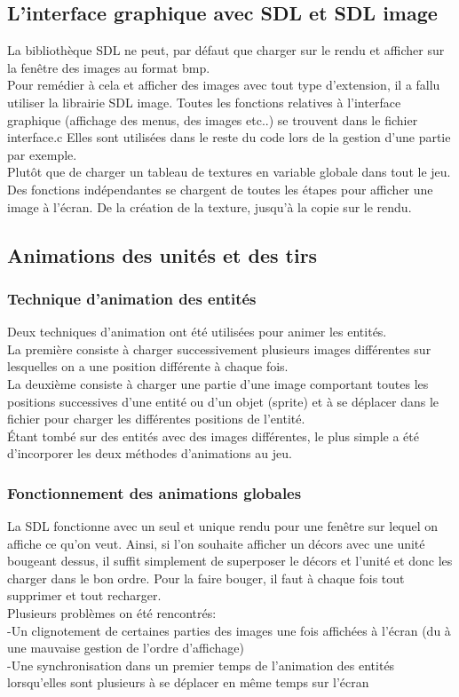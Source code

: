 \documentclass[a4paper,11pt]{article}
\begin{document}
\subsection{L'interface graphique avec SDL et SDL image}

La bibliothèque SDL ne peut, par défaut que charger sur le rendu et afficher sur la fenêtre des images au format bmp.\\
Pour remédier à cela et afficher des images avec tout type d'extension, il a fallu utiliser la librairie SDL image.
Toutes les fonctions relatives à l'interface graphique (affichage des menus, des images etc..) se trouvent dans le fichier interface.c
Elles sont utilisées dans le reste du code lors de la gestion d'une partie par exemple.\\
Plutôt que de charger un tableau de textures en variable globale dans tout le jeu. Des fonctions indépendantes se chargent
de toutes les étapes pour afficher une image à l'écran. De la création de la texture, jusqu'à la copie sur le rendu.
\subsection{Animations des unités et des tirs}
\subsubsection{Technique d'animation des entités}
Deux techniques d'animation ont été utilisées pour animer les entités.\\ La première consiste à charger successivement plusieurs images différentes
sur lesquelles on a une position différente à chaque fois.\\ La deuxième consiste à charger une partie d'une image comportant toutes les positions successives
d'une entité ou d'un objet (sprite) et à se déplacer dans le fichier pour charger les
différentes positions de l'entité.\\ Étant tombé sur des entités avec des images différentes, le plus simple a été d'incorporer les deux méthodes
d'animations au jeu.
\subsubsection{Fonctionnement des animations globales}
La SDL fonctionne avec un seul et unique rendu pour une fenêtre sur lequel on affiche ce qu'on veut. Ainsi, 
si l'on souhaite afficher un décors avec une unité bougeant dessus, il suffit simplement de superposer le décors et l'unité 
et donc les charger dans le bon ordre. Pour la faire bouger, il faut à chaque fois tout supprimer et tout recharger. \\
Plusieurs problèmes on été rencontrés:\\
-Un clignotement de certaines parties des images une fois affichées à l'écran (du à une mauvaise gestion de l'ordre d'affichage)\\
-Une synchronisation dans un premier temps de l'animation des entités lorsqu'elles sont plusieurs à se déplacer en même temps sur l'écran\\\\
\end{document}
